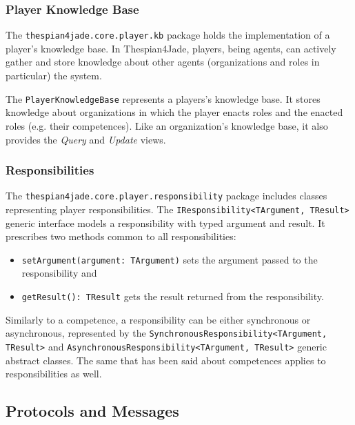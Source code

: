 \subsubsection{Player Knowledge Base}

The \texttt{thespian4jade.core.player.kb} package holds the implementation of a player's knowledge base.
In Thespian4Jade, players, being agents, can actively gather and store knowledge about other agents (organizations and roles in particular) the system.

The \texttt{PlayerKnowledgeBase} represents a players's knowledge base.
It stores knowledge about organizations in which the player enacts roles and the enacted roles (e.g. their competences).
Like an organization's knowledge base, it also provides the \textit{Query} and \textit{Update} views.

\subsubsection{Responsibilities}

The \texttt{thespian4jade.core.player.responsibility} package includes classes representing player responsibilities.
The \texttt{IResponsibility<TArgument, TResult>} generic interface models a responsibility with typed argument and result.
It prescribes two methods common to all responsibilities:
\begin{itemize}
	\item \texttt{setArgument(argument: TArgument)} sets the argument passed to the responsibility and
	\item \texttt{getResult(): TResult} gets the result returned from the responsibility.
\end{itemize}

Similarly to a competence, a responsibility can be either synchronous or asynchronous, represented by the \texttt{SynchronousResponsibility<TArgument, TResult>} and \texttt{AsynchronousResponsibility<TArgument, TResult>} generic abstract classes.
The same that has been said about competences applies to responsibilities as well.

\subsection{Protocols and Messages}

